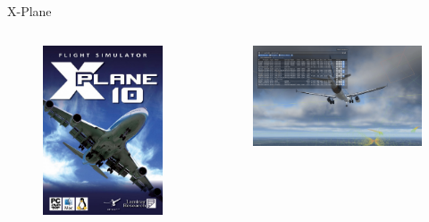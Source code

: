 \documentclass[12pt,aspectratio=169]{beamer}
\begin{document}
%
\begin{frame}{X-Plane}
	\begin{columns}
	\begin{figure}
		\includegraphics[height=0.7\textheight]{x-plane10.jpg}
	\end{figure}
	\begin{figure}
		\includegraphics[height=0.5\textheight]{x-plane10-data.png}
	\end{figure}
	\end{columns}
\end{frame}
\end{document}
